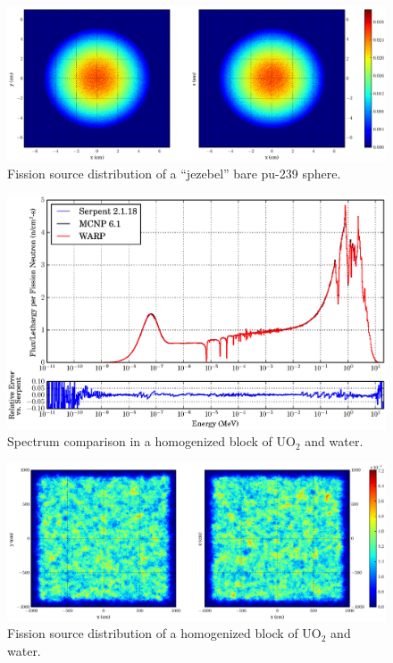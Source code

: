 \begin{figure}[h!]
\centering
\includegraphics[width=\textwidth,trim= 2cm 0cm 2cm 0cm]{graphics/finalresults/godiva_fiss-6.eps}
\caption{Fission source distribution of a ``jezebel'' bare pu-239 sphere. \label{godiva_fiss} }
\end{figure}

\begin{figure}[h!] 
\centering
\includegraphics[width=\textwidth]{graphics/finalresults/homfuel_spec-6.eps}
\caption{Spectrum comparison in a homogenized block of UO$_2$ and water. \label{homfuel_spec} }
\end{figure}

\begin{figure}[h!]
\centering
\includegraphics[width=\textwidth,trim= 2cm 0cm 2cm 0cm]{graphics/finalresults/homfuel_fiss-6.eps}
\caption{Fission source distribution of a homogenized block of UO$_2$ and water. \label{homfuel_fiss} }
\end{figure}

